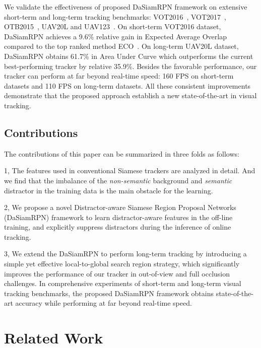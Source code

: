 \documentclass[runningheads]{llncs}
\begin{document}
We validate the effectiveness of proposed DaSiamRPN framework on extensive short-term and long-term tracking benchmarks: VOT2016~\cite{VOT2016}, VOT2017~\cite{VOT2017}, OTB2015~\cite{OTB2015}, UAV20L and UAV123~\cite{UAV}.
On short-term VOT2016 dataset, DaSiamRPN achieves a 9.6\% relative gain in Expected Average Overlap compared to the top ranked method ECO~\cite{ECO}.
On long-term UAV20L dataset, DaSiamRPN obtains 61.7\% in Area Under Curve which outperforms the current best-performing tracker by relative 35.9\%.
Besides the favorable performance, our tracker can perform at far beyond real-time speed: 160 FPS on short-term datasets and 110 FPS on long-term datasets.
All these consistent improvements demonstrate that the proposed approach establish a new state-of-the-art in visual tracking.


\subsection{Contributions}

The contributions of this paper can be summarized in three folds as follows:

1, The features used in conventional Siamese trackers are analyzed in detail. And we find that the imbalance of the \textit{non-semantic} background and \textit{semantic} distractor in the training data is the main obstacle for the learning. 

2, We propose a novel Distractor-aware Siamese Region Proposal Networks (DaSiamRPN) framework to learn distractor-aware features in the off-line training,  and explicitly suppress distractors during the inference of online tracking.

3, We extend the DaSiamRPN to perform long-term tracking by introducing a simple yet effective local-to-global search region strategy, which significantly improves the performance of our tracker in out-of-view and full occlusion challenges. In comprehensive experiments of short-term and long-term visual tracking benchmarks, the proposed DaSiamRPN framework obtains state-of-the-art accuracy while performing at far beyond real-time speed.


\section{Related Work}
\end{document}
